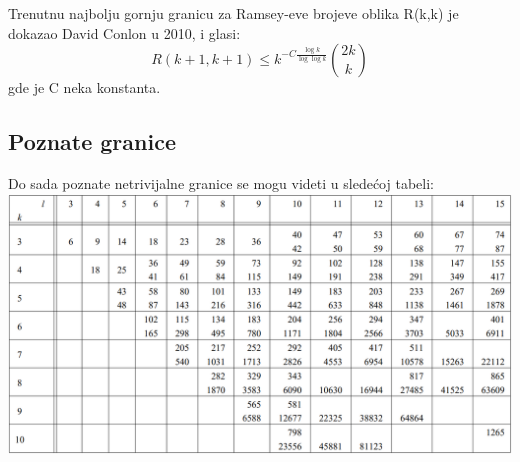 \documentclass[12pt,a4paper]{article}
\begin{document}
Trenutnu najbolju gornju granicu za Ramsey-eve brojeve oblika R(k,k) je dokazao David Conlon u 2010, i glasi:
\[R(k+1,k+1)\leq k^{-C\frac{\log{k}}{\log{\log{k}}}}\binom{2k}{k}\]
gde je C neka konstanta.
\subsection{Poznate granice}
Do sada poznate netrivijalne granice se mogu videti u sledećoj tabeli:
\vspace{0.5em} \\
\includegraphics[width=\textwidth]{poznateGranice.png} %
\end{document}
